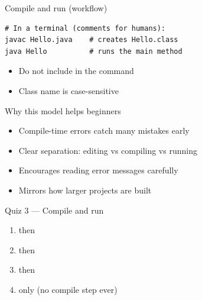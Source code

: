 \documentclass[aspectratio=169,11pt]{beamer}
\begin{document}
    \begin{frame}[fragile]{Compile and run (workflow)}
        \begin{lstlisting}
# In a terminal (comments for humans):
javac Hello.java    # creates Hello.class
java Hello          # runs the main method
        \end{lstlisting}
        \vspace{0.4em}
        \begin{itemize}
            \item Do not include  in the  command
            \item Class name is case-sensitive
        \end{itemize}
        \vspace{0.3em}
    \end{frame}

    \begin{frame}{Why this model helps beginners}
        \begin{itemize}
            \item Compile-time errors catch many mistakes early
            \item Clear separation: editing vs compiling vs running
            \item Encourages reading error messages carefully
            \item Mirrors how larger projects are built
        \end{itemize}
    \end{frame}

    \begin{frame}{Quiz 3 --- Compile and run}
        \begin{enumerate}
            \item {} then 
            \item {} then 
            \item {} then 
            \item {} only (no compile step ever)
        \end{enumerate}
        \quizpause
    \end{frame}
\end{document}
